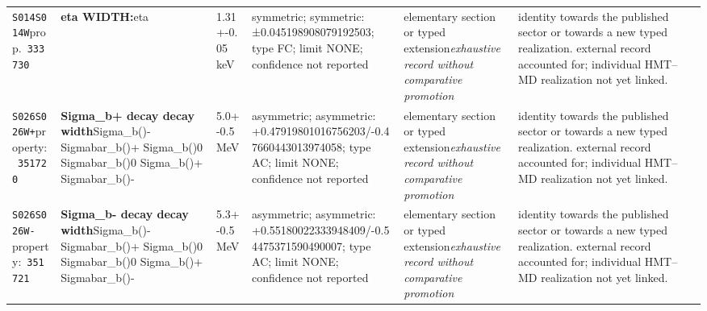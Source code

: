 \begin{landscape}
\begin{longtable}{L{1.85cm}L{4.45cm}L{2.35cm}L{4.05cm}L{3.35cm}L{7.15cm}}
\texttt{S014}\newline \texttt{S014W}\newline prop.\ \texttt{333730} & \textbf{eta WIDTH:}\newline eta & 1.31+-0.05\,keV & symmetric; symmetric: ±0.045198908079192503; type FC; limit NONE; confidence not reported & elementary section or typed extension\newline \emph{exhaustive record without comparative promotion} & identity towards the published sector or towards a new typed realization. external record accounted for; individual HMT--MD realization not yet linked. \\
\texttt{S026}\newline \texttt{S026W+}\newline property:\ \texttt{351720} & \textbf{Sigma\_\allowbreak{}b+ decay decay width}\newline Sigma\_\allowbreak{}b()- \textbar{}\allowbreak{} Sigmabar\_\allowbreak{}b()+ \textbar{}\allowbreak{} Sigma\_\allowbreak{}b()0 \textbar{}\allowbreak{} Sigmabar\_\allowbreak{}b()0 \textbar{}\allowbreak{} Sigma\_\allowbreak{}b()+ \textbar{}\allowbreak{} Sigmabar\_\allowbreak{}b()- & 5.0+-0.5\,MeV & asymmetric; asymmetric: +0.47919801016756203/-0.47660443013974058; type AC; limit NONE; confidence not reported & elementary section or typed extension\newline \emph{exhaustive record without comparative promotion} & identity towards the published sector or towards a new typed realization. external record accounted for; individual HMT--MD realization not yet linked. \\
\texttt{S026}\newline \texttt{S026W-}\newline property:\ \texttt{351721} & \textbf{Sigma\_\allowbreak{}b- decay decay width}\newline Sigma\_\allowbreak{}b()- \textbar{}\allowbreak{} Sigmabar\_\allowbreak{}b()+ \textbar{}\allowbreak{} Sigma\_\allowbreak{}b()0 \textbar{}\allowbreak{} Sigmabar\_\allowbreak{}b()0 \textbar{}\allowbreak{} Sigma\_\allowbreak{}b()+ \textbar{}\allowbreak{} Sigmabar\_\allowbreak{}b()- & 5.3+-0.5\,MeV & asymmetric; asymmetric: +0.55180022333948409/-0.54475371590490007; type AC; limit NONE; confidence not reported & elementary section or typed extension\newline \emph{exhaustive record without comparative promotion} & identity towards the published sector or towards a new typed realization. external record accounted for; individual HMT--MD realization not yet linked. \\

\end{longtable}
\end{landscape}
